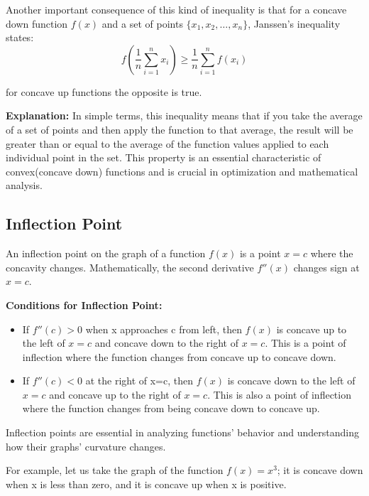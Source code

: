 Another important consequence of this kind of inequality is that for a concave down function $f(x)$ and a set of points $\{ x_1, x_2, \ldots, x_n \}$, Janssen's inequality states:
\[
f\left(\frac{1}{n}\sum_{i=1}^{n} x_i\right) \geq \frac{1}{n}\sum_{i=1}^{n} f(x_i)
\]

for concave up functions the opposite is true. 

\textbf{Explanation:}
In simple terms, this inequality means that if you take the average of a set of points and then apply the function to that average, the result will be greater than or equal to the average of the function values applied to each individual point in the set. This property is an essential characteristic of convex(concave down) functions and is crucial in optimization and mathematical analysis.


\subsection{Inflection Point}

An inflection point on the graph of a function $f(x)$ is a point $x = c$ where the concavity changes. Mathematically, the second derivative $f''(x)$ changes sign at $x = c$.

\textbf{Conditions for Inflection Point:}

\begin{itemize}
    \item If $f''(c) > 0$ when x approaches c from left, then $f(x)$ is concave up to the left of $x = c$ and concave down to the right of $x = c$. This is a point of inflection where the function changes from concave up to concave down.
    
    \item If $f''(c) < 0$ at the right of x=c, then $f(x)$ is concave down to the left of $x = c$ and concave up to the right of $x = c$. This is also a point of inflection where the function changes from being concave down to concave up.
\end{itemize}

Inflection points are essential in analyzing functions' behavior and understanding how their graphs' curvature changes.

For example, let us take the graph of the function $f(x) = x^3$; it is concave down when x is less than zero, and it is concave up when x is positive. 


